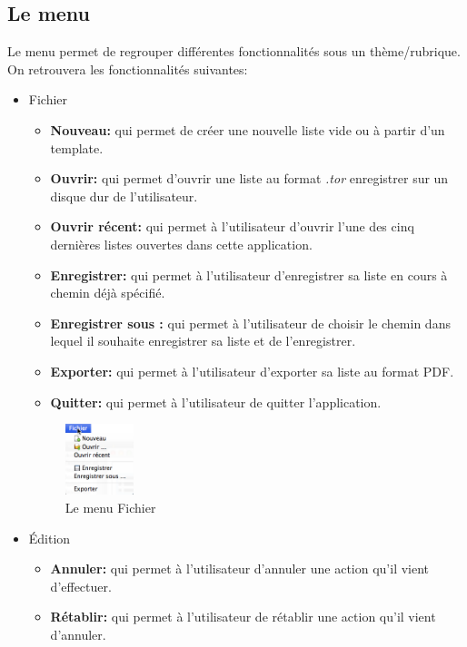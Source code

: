 \documentclass[a4paper,10pt]{article}
\begin{document}
\subsection{Le menu}
Le menu permet de regrouper différentes fonctionnalités sous un thème/rubrique.
On retrouvera les fonctionnalités suivantes:
\begin{itemize}
\item Fichier
\begin{itemize}
\item \textbf{Nouveau:} qui permet de créer une nouvelle liste vide ou à partir d'un template.
\item \textbf{Ouvrir:} qui permet d'ouvrir une liste au format \textit{.tor} enregistrer sur un disque dur de l'utilisateur.
\item \textbf{Ouvrir récent:} qui permet à l'utilisateur d'ouvrir l'une des cinq dernières listes ouvertes dans cette application.
\item \textbf{Enregistrer:} qui permet à l'utilisateur d'enregistrer sa liste en cours à chemin déjà spécifié.
\item \textbf{Enregistrer sous :} qui permet à l'utilisateur de choisir le chemin dans lequel il souhaite enregistrer sa liste et de l'enregistrer.
\item \textbf{Exporter:} qui permet à l'utilisateur d'exporter sa liste au format PDF.
\item \textbf{Quitter:} qui permet à l'utilisateur de quitter l'application.
\end{itemize}
\begin{figure}[H]
    \center
    \includegraphics[width=2cm]{Images/menuFichier.png}
    \caption{Le menu Fichier}
\end{figure}
\item Édition
\begin{itemize}
\item \textbf{Annuler:} qui permet à l'utilisateur d'annuler une action qu'il vient d'effectuer.
\item \textbf{Rétablir:} qui permet à l'utilisateur de rétablir une action qu'il vient d'annuler.

\end{itemize}
\end{itemize}
\end{document}
